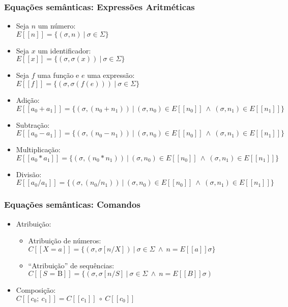 \documentclass{beamer}
\begin{document}
\begin{frame}[fragile]
\frametitle{Equa\c c\~oes sem\^anticas: Express\~oes Aritm\'eticas}
  \begin{itemize}
  \item Seja $n$ um n\'umero:\\
    $E[[n]] = \{(\sigma, n)\ |\ \sigma \in \Sigma\}$
  \item Seja $x$ um identificador:\\
    $E[[x]] = \{(\sigma, \sigma (x))\ |\ \sigma \in \Sigma\}$
  \item Seja $f$ uma fun\c c\~ao e $e$ uma express\~ao:\\
    $E[[f]] = \{(\sigma, \sigma (f(e)))\ |\ \sigma \in \Sigma\}$
  \item Adi\c c\~ao:\\
    $E[[a_0 + a_1]] = \{(\sigma, (n_0 + n_1))\ |\ (\sigma, n_0) \in
    E[[n_0]]\ \wedge\ (\sigma, n_1) \in E[[n_1]]\}$
  \item Subtra\c c\~ao:\\
    $E[[a_0 - a_1]] = \{(\sigma, (n_0- n_1))\ |\ (\sigma, n_0) \in
    E[[n_0]]\ \wedge\ (\sigma, n_1) \in E[[n_1]]\}$
  \item Multiplica\c c\~ao:\\
    $E[[a_0 * a_1]] = \{(\sigma, (n_0 * n_1))\ |\ (\sigma, n_0) \in
    E[[n_0]]\ \wedge\ (\sigma, n_1) \in E[[n_1]]\}$
  \item Divis\~ao:\\
    $E[[a_0 / a_1]] = \{(\sigma, (n_0 / n_1))\ |\ (\sigma, n_0) \in
    E[[n_0]]\ \wedge\ (\sigma, n_1) \in E[[n_1]]\}$
  \end{itemize}
\end{frame}

\begin{frame}[fragile]
\frametitle{Equa\c c\~oes sem\^anticas: Comandos}
  \begin{itemize}
  \item Atribui\c c\~ao:
    \begin{itemize}
    \item Atribui\c c\~ao de n\'umeros:\\
      $C[[X = a]] = \{(\sigma, \sigma[n / X])\ |\ \sigma \in \Sigma\
      \wedge\ n = E[[a]]\sigma\}$

    \item ``Atribui\c c\~ao'' de sequ\^encias:\\
      $C[[S \mbox{ = B}]] = \{(\sigma, \sigma[n / S]\ |\ \sigma \in \Sigma\
      \wedge\ n = E[[B]]\sigma)$
    \end{itemize}
  \item Composi\c c\~ao:\\
    $C[[c_0;\ c_1]] = C[[c_1]]\ \circ\ C[[c_0]]$
  \end{itemize}
\end{frame}
\end{document}
